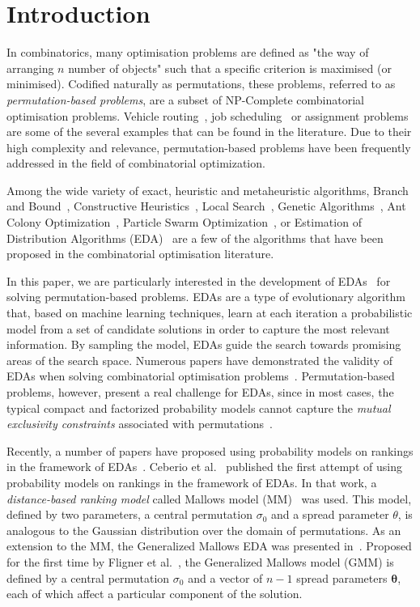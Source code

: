 \documentclass[conference]{IEEEtran}
\begin{document}

\section{Introduction}
In combinatorics, many optimisation problems are defined as "the way of arranging $n$ number of objects" such that a specific criterion is maximised (or minimised). 
Codified naturally as permutations, these problems, referred to as {\it permutation-based problems}, are a subset of NP-Complete combinatorial optimisation problems. Vehicle routing~\cite{Tsutsui_VR}, job scheduling~\cite{Hejazi04} or assignment problems~\cite{Burkard98} are some of the several examples that can be found in the literature. Due to their high complexity and relevance, permutation-based problems have been frequently addressed in the field of combinatorial optimization.

Among the wide variety of exact, heuristic and metaheuristic algorithms, Branch and Bound~\cite{Wang1995}, Constructive Heuristics~\cite{Glover01}, Local Search~\cite{Stutzle06}, Genetic Algorithms~\cite{larranaga99}, Ant Colony Optimization~\cite{Chira2009}, Particle Swarm Optimization~\cite{Tasgetiren20071930}, or Estimation of Distribution Algorithms (EDA)~\cite{ceberio11b,lozano05} are a few of the algorithms that have been proposed in the combinatorial optimisation literature.

In this paper, we are particularly interested in the development of EDAs~\cite{muhlenbein96,larra01a} for solving permutation-based problems. EDAs are a type of evolutionary algorithm that, based on machine learning techniques, learn at each iteration a probabilistic model from a set of candidate solutions in order to capture the most relevant information. By sampling the model, EDAs guide the search towards promising areas of the search space. Numerous papers have demonstrated the validity of EDAs when solving combinatorial optimisation problems~\cite{larra01a,lozano05,Pelikan06,santana00,Qingfu05,ceberio13c,santana2008}. Permutation-based problems, however, present a real challenge for EDAs, since in most cases, the typical compact and factorized probability models cannot capture the {\it mutual exclusivity constraints} associated with permutations~\cite{huang2009}.

Recently, a number of papers have proposed using probability models on rankings in the framework of EDAs~\cite{ceberio11c,ceberio13a,ceberio13b, aledo2013}. Ceberio et al.~\cite{ceberio11c} published the first attempt of using probability models on rankings in the framework of EDAs. In that work, a {\it distance-based ranking model} called Mallows model (MM)~\cite{mallows,diaconis1988group,gMallows,Critchlow1991294} was used. This model, defined by two parameters, a central permutation $\sigma_0$ and a spread parameter $\theta$, is analogous to the Gaussian distribution over the domain of permutations. As an extension to the MM, the Generalized Mallows EDA was presented in~\cite{ceberio13a}. Proposed for the first time by Fligner et al.~\cite{fligner1988}, the Generalized Mallows model (GMM) is defined by a central permutation $\sigma_0$ and a vector of $n-1$ spread parameters $\boldsymbol{\theta}$, each of which affect a particular component of the solution.
\end{document}
